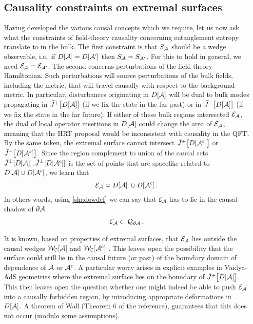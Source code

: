 \documentclass[12pt]{article}
\def\bulkJ{{\tilde J}}
\def\splrel{\asymp}
\def\regA{{\cal A}}
\def\regAc{{\cal A}^c}
\def\entsurf{
\partial \regA}
\def\domdA{D[\regA]}
\def\domdAc{D[\regAc]}
\def\extr{{\cal E}_\regA}
\def\CWA{{\cal W}_{\cal C}[\regA]}
\def\CWAc{{\cal W}_{\cal C}[{\regAc}]}
\def\shadow{{\cal Q}}
\begin{document}
\subsection{Causality constraints on extremal surfaces}
\label{sec:bulkextc}

Having developed the various causal concepts which we require, let us now ask what the constraints of field-theory causality concerning entanglement entropy translate to in the bulk. The first constraint is that $S_\regA$ should be a wedge observable, i.e.\ if $D[\regA]=D[\regA']$ then $S_\regA=S_{\regA'}$. For this to hold in general, we need $\extr={\cal E}_{\regA'}$. The second concerns perturbations of the field-theory Hamiltonian.
Such perturbations will source perturbations of the bulk fields, including the metric, that will travel causally with respect to the background metric. In particular, disturbances originating in $\domdA$ will be dual to bulk modes propagating in $\bulkJ^+\big[\domdA\big]$ (if we fix the state in the far past) or in $\bulkJ^-\big[\domdA\big]$ (if we fix the state in the far future). If either of these bulk regions intersected $\extr$, the dual of local operator insertions in $D[\regA]$ could change the area of $\extr$, meaning that the HRT proposal would be inconsistent with causality in the QFT. By the same token, the extremal surface cannot intersect  $\bulkJ^+\big[\domdAc\big]$ or  $\bulkJ^-\big[\domdAc\big]$. Since the region complement to union of the causal sets  $\bulkJ^\pm[D[\regA]], \bulkJ^{\pm}[D[\regAc]]$ is the set of points that are spacelike related to $D[\regA]\cup D[\regAc]$, we learn that 
%
\begin{equation}
\extr \splrel \domdA \;\cup \domdAc \,.
\label{bulkcausal1}
\end{equation}	
%
In others words, using \eqref{shadowdef} we can say that $\extr$ has to lie in the causal shadow of $\entsurf$
%
\begin{equation}
\extr \subset \shadow_{\entsurf}\,.
\label{}
\end{equation}	
%

It is known, based on properties of extremal surfaces, that $\extr$ lies outside the causal wedges $\CWA$ and $\CWAc$ \cite{Hubeny:2012wa,Wall:2012uf, Hubeny:2013gba}. This leaves open the possibility that the surface could still lie in the causal future (or past) of the boundary domain of dependence of $\regA$ or $\regAc$. A particular worry arises in explicit examples in Vaidya-AdS geometries where the extremal surface lies on the boundary of $\bulkJ^+\big[\domdA \big]$. This then leaves open the question whether one might indeed be able to push $\extr$ into a causally forbidden region, by introducing appropriate deformations in $\domdA$.  A theorem of Wall \cite{Wall:2012uf} (Theorem 6 of the reference), guarantees that this does not occur (modulo some assumptions). 
\end{document}
